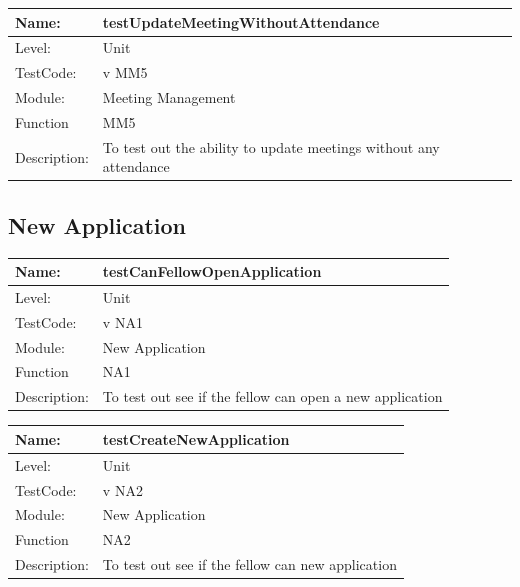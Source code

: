 \documentclass[12pt]{article}
\begin{document}
\begin{flushleft}
\begin{center}
\begin{tabular}{|l|p{12cm}|}
 Name: & testUpdateMeetingWithoutAttendance  \\
\hline
Level: & Unit \\
\hline
TestCode: & v MM5 \\
\hline
Module:& Meeting Management \\
\hline
Function & MM5 \\
\hline
Description: & To test out the ability to update meetings without any attendance  \\
\hline
\end{tabular}
\end{center}

\subsection{New Application}
\begin{center}
\begin{tabular}{|l|p{12cm}|}
\hline

 Name: & testCanFellowOpenApplication  \\
\hline
Level: & Unit \\
\hline
TestCode: & v NA1 \\
\hline
Module:& New Application\\
\hline
Function & NA1 \\
\hline
Description: & To test out see if the fellow can open a new application  \\
\hline

\end{tabular}
\end{center}

\begin{center}
\begin{tabular}{|l|p{12cm}|}
\hline

 Name: & testCreateNewApplication  \\
\hline
Level: & Unit \\
\hline
TestCode: & v NA2 \\
\hline
Module:& New Application\\
\hline
Function & NA2 \\
\hline
Description: & To test out see if the fellow can  new application  \\
\hline

\end{tabular}
\end{center}


\end{flushleft}
\end{document}
